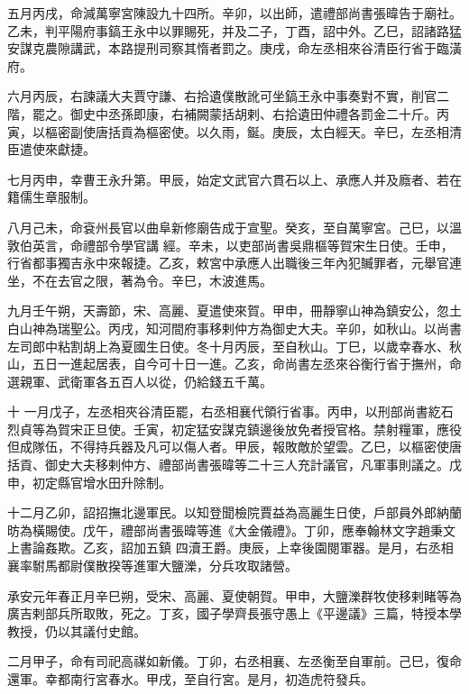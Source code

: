 \begin{pinyinscope}
 五月丙戌，命減萬寧宮陳設九十四所。辛卯，以出師，遣禮部尚書張暐告于廟社。乙未，判平陽府事鎬王永中以罪賜死，并及二子，丁酉，詔中外。乙巳，詔諸路猛
 安謀克農隙講武，本路提刑司察其惰者罰之。庚戌，命左丞相來谷清臣行省于臨潢府。



 六月丙辰，右諫議大夫賈守謙、右拾遺僕散訛可坐鎬王永中事奏對不實，削官二階，罷之。御史中丞孫即康，右補闕蒙括胡剌、右拾遺田仲禮各罰金二十斤。丙寅，以樞密副使唐括貢為樞密使。以久雨，鋋。庚辰，太白經天。辛巳，左丞相清臣遣使來獻捷。



 七月丙申，幸曹王永升第。甲辰，始定文武官六貫石以上、承應人并及廕者、若在籍儒生章服制。



 八月己未，命袞州長官以曲阜新修廟告成于宣聖。癸亥，至自萬寧宮。己巳，以溫敦伯英言，命禮部令學官講
 經。辛未，以吏部尚書吳鼎樞等賀宋生日使。壬申，行省都事獨吉永中來報捷。乙亥，敕宮中承應人出職後三年內犯贓罪者，元舉官連坐，不在去官之限，著為令。辛巳，木波進馬。



 九月壬午朔，天壽節，宋、高麗、夏遣使來賀。甲申，冊靜寧山神為鎮安公，忽土白山神為瑞聖公。丙戌，知河間府事移剌仲方為御史大夫。辛卯，如秋山。以尚書左司郎中粘割胡上為夏國生日使。冬十月丙辰，至自秋山。丁巳，以歲幸春水、秋山，五日一進起居表，自今可十日一進。乙亥，命尚書左丞來谷衡行省于撫州，命選親軍、武衛軍各五百人以從，仍給錢五千萬。



 十
 一月戊子，左丞相夾谷清臣罷，右丞相襄代領行省事。丙申，以刑部尚書紇石烈貞等為賀宋正旦使。壬寅，初定猛安謀克鎮邊後放免者授官格。禁射糧軍，應役但成隊伍，不得持兵器及凡可以傷人者。甲辰，報敗敵於望雲。乙巳，以樞密使唐括貢、御史大夫移剌仲方、禮部尚書張暐等二十三人充計議官，凡軍事則議之。戊申，初定縣官增水田升除制。



 十二月乙卯，詔招撫北邊軍民。以知登聞檢院賈益為高麗生日使，戶部員外郎納蘭昉為橫賜使。戊午，禮部尚書張暐等進《大金儀禮》。丁卯，應奉翰林文字趙秉文上書論姦欺。乙亥，詔加五鎮
 四瀆王爵。庚辰，上幸後園閱軍器。是月，右丞相襄率駙馬都尉僕散揆等進軍大鹽濼，分兵攻取諸營。



 承安元年春正月辛巳朔，受宋、高麗、夏使朝賀。甲申，大鹽濼群牧使移剌睹等為廣吉剌部兵所取敗，死之。丁亥，國子學齊長張守愚上《平邊議》三篇，特授本學教授，仍以其議付史館。



 二月甲子，命有司祀高禖如新儀。丁卯，右丞相襄、左丞衡至自軍前。己巳，復命還軍。幸都南行宮春水。甲戌，至自行宮。是月，初造虎符發兵。




\end{pinyinscope}
